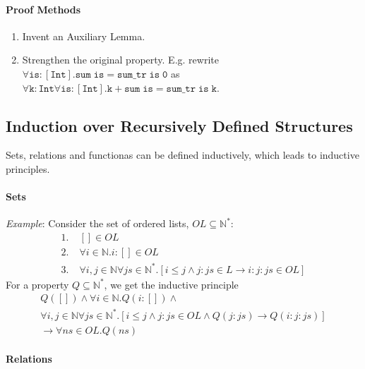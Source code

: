 \documentclass[10pt,twoside,twocolumn]{article}
\begin{document}
\paragraph{Proof Methods}
\begin{enumerate}
\item Invent an Auxiliary Lemma.
\item Strengthen the original property. E.g. rewrite $\forall\mathtt{is}:\mathtt{[Int]}.\mathtt{sum}\;\mathtt{is}=\mathtt{sum\_tr\;is\;0}$
as $\forall\mathtt{k}:\mathtt{Int}\forall\mathtt{is}:\mathtt{[Int]}.\mathtt{k}+\mathtt{sum}\;\mathtt{is}=\mathtt{sum\_tr\;is\;k}$.
\end{enumerate}

\subsection{Induction over Recursively Defined Structures}

Sets, relations and functionas can be defined inductively, which leads
to inductive principles.


\paragraph{Sets}

\emph{Example}: Consider the set of ordered lists, $OL\subseteq\mathbb{N}^{*}$:
\begin{align*}
1.\; & []\in OL\\
2.\; & \forall i\in\mathbb{N}.i:[]\in OL\\
3.\; & \forall i,j\in\mathbb{N}\forall js\in\mathbb{N}^{*}.\left[i\leq j\land j:js\in L\rightarrow i:j:js\in OL\right]
\end{align*}
For a property $Q\subseteq\mathbb{N}^{*}$, we get the inductive principle
\begin{multline*}
Q\left([]\right)\land\forall i\in\mathbb{N}.Q\left(i:[]\right)\land\\
\forall i,j\in\mathbb{N}\forall js\in\mathbb{N}^{*}.\left[i\leq j\land j:js\in OL\land Q\left(j:js\right)\rightarrow Q\left(i:j:js\right)\right]\\
\rightarrow\forall ns\in OL.Q\left(ns\right)
\end{multline*}



\paragraph{Relations}
\end{document}
